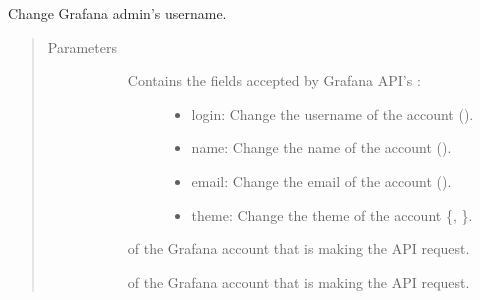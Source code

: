 \documentclass[letterpaper,10pt,english]{sphinxmanual}
\begin{document}

\begin{fulllineitems}
\label{\detokenize{setup:gpSetup.renameAdminUser}}
Change Grafana admin’s username.
\begin{quote}\begin{description}
\item[{Parameters}] \leavevmode\begin{description}
\item[{}] \leavevmode\begin{description}
\item[{Contains the fields accepted by Grafana API’s :}] \leavevmode\begin{itemize}
\item {} 
login: Change the username of the account ().

\item {} 
name: Change the name of the account ().

\item {} 
email: Change the email of the account ().

\item {} 
theme: Change the theme of the account \{, \}.

\end{itemize}

\end{description}

\item[{}] \leavevmode{[}\sphinxtitleref{str}{]}
 of the Grafana account that is making the API request.

\item[{}] \leavevmode{[}\sphinxtitleref{str}{]}
 of the Grafana account that is making the API request.

\end{description}

\end{description}\end{quote}



\end{fulllineitems}
\end{document}
